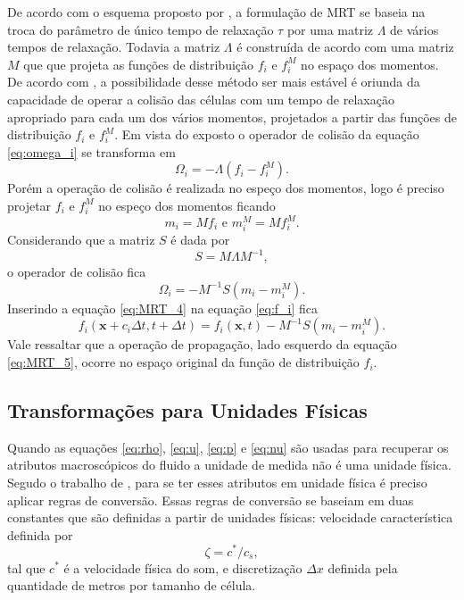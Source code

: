 De acordo com o esquema proposto por , a formulação de MRT se baseia na troca do parâmetro de único tempo de relaxação $\tau$ por uma matriz \textbf{$\Lambda$} de vários tempos de relaxação. Todavia a matriz \textbf{$\Lambda$} é construída de acordo com uma matriz \textbf{$M$} que que projeta as funções de distribuição $f_{i}$ e $f_{i}^{M}$ no espaço dos momentos. De acordo com , a possibilidade desse método ser mais estável é oriunda da capacidade de operar a colisão das células com um tempo de relaxação apropriado para cada um dos vários momentos, projetados a partir das funções de distribuição $f_{i}$ e $f_{i}^{M}$. Em vista do exposto o operador de colisão da equação \ref{eq:omega_i} se transforma em
\begin{equation}
	\Omega_{i} = -\textbf{$\Lambda$}(f_{i} - f_{i}^{M}).
    \label{eq:MRT_1}
\end{equation}
Porém a operação de colisão é realizada no espeço dos momentos, logo é preciso projetar $f_{i}$ e $f_{i}^{M}$ no espeço dos momentos ficando
\begin{equation}
	m_{i} = \textbf{$M$}f_{i} \text{ e } m_{i}^{M} = \textbf{$M$}f_{i}^{M}.
    \label{eq:MRT_2}
\end{equation}
Considerando que a matriz \textbf{$S$} é dada por
\begin{equation}
	\textbf{$S$} = \textbf{$M$}\textbf{$\Lambda$}\textbf{$M$}^{-1},
    \label{eq:MRT_3}
\end{equation}
o operador de colisão fica
\begin{equation}
	\Omega_{i} = -\textbf{$M$}^{-1}\textbf{$S$}(m_{i} - m_{i}^{M}).
    \label{eq:MRT_4}
\end{equation}
Inserindo a equação \ref{eq:MRT_4} na equação \ref{eq:f_i} fica
\begin{equation}
	f_{i}(\textbf{x} + c_{i}\Delta t, t + \Delta t) = f_{i}(\textbf{x}, t) -\textbf{$M$}^{-1}\textbf{$S$}(m_{i} - m_{i}^{M}).
    \label{eq:MRT_5}
\end{equation}
Vale ressaltar que a operação de propagação, lado esquerdo da equação \ref{eq:MRT_5}, ocorre no espaço original da função de distribuição $f_{i}$.

\subsection{Transformações para Unidades Físicas}

Quando as equações \ref{eq:rho}, \ref{eq:u}, \ref{eq:p} e \ref{eq:nu} são usadas para recuperar os atributos macroscópicos do fluido a unidade de medida não é uma unidade física. Segudo o trabalho de , para se ter esses atributos em unidade física é preciso aplicar regras de conversão. Essas regras de conversão se baseiam em duas constantes que são definidas a partir de unidades físicas: velocidade característica definida por   
\begin{equation}
	\zeta = c^{*}/c_{s},
    \label{eq:conversao_1}
\end{equation}
tal que $c^{*}$ é a velocidade física do som, e discretização $\Delta x$ definida pela quantidade de metros por tamanho de célula.

